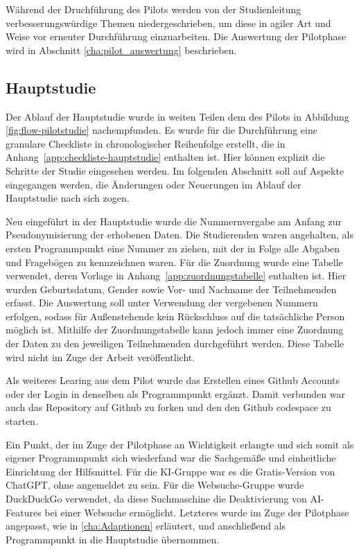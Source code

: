 Während der Druchführung des Pilots werden von der Studienleitung verbesserungswürdige Themen niedergeschrieben, um diese in agiler Art und Weise vor erneuter Durchführung einzuarbeiten. Die Auswertung der Pilotphase wird in Abschnitt \ref{cha:pilot_auswertung} beschrieben.

\subsection{Hauptstudie}

Der Ablauf der Hauptstudie wurde in weiten Teilen dem des Pilots in Abbildung \ref{fig:flow-pilotstudie} nachempfunden. Es wurde für die Durchführung eine granulare Checkliste in chronologischer Reihenfolge erstellt, die in Anhang~\ref{app:checkliste-hauptstudie} enthalten ist. Hier können explizit die Schritte der Studie eingesehen werden. Im folgenden Abschnitt soll auf Aspekte eingegangen werden, die Änderungen oder Neuerungen im Ablauf der Hauptstudie nach sich zogen.

Neu eingeführt in der Hauptstudie wurde die Nummernvergabe am Anfang zur Pseudonymisierung der erhobenen Daten. Die Studierenden waren angehalten, als ersten Programmpunkt eine Nummer zu ziehen, mit der in Folge alle Abgaben und Fragebögen zu kennzeichnen waren. Für die Zuordnung wurde eine Tabelle verwendet, deren Vorlage in Anhang~\ref{app:zuordnungstabelle} enthalten ist. Hier wurden Geburtsdatum, Gender sowie Vor- und Nachname der Teilnehmenden erfasst. Die Auswertung soll unter Verwendung der vergebenen Nummern erfolgen, sodass für Außenstehende kein Rückschluss auf die tatsächliche Person möglich ist. Mithilfe der Zuordnungstabelle kann jedoch immer eine Zuordnung der Daten zu den jeweiligen Teilnehmenden durchgeführt werden. Diese Tabelle wird nicht im Zuge der Arbeit veröffentlicht.

Als weiteres Learing aus dem Pilot wurde das Erstellen eines Github Accounts oder der Login in denselben als Programmpunkt ergänzt. Damit verbunden war auch das Repository auf Github zu forken und den den Github codespace zu starten.

Ein Punkt, der im Zuge der Pilotphase an Wichtigkeit erlangte und sich somit als eigener Programmpunkt sich wiederfand war die Sachgemäße und einheitliche Einrichtung der Hilfsmittel. Für die KI-Gruppe war es die Gratis-Version von ChatGPT, ohne angemeldet zu sein. Für die Websuche-Gruppe wurde DuckDuckGo verwendet, da diese Suchmaschine die Deaktivierung von AI-Features bei einer Websuche ermöglicht. Letzteres wurde im Zuge der Pilotphase angepasst, wie in \ref{cha:Adaptionen} erläutert, und anschließend als Programmpunkt in die Hauptstudie übernommen.

